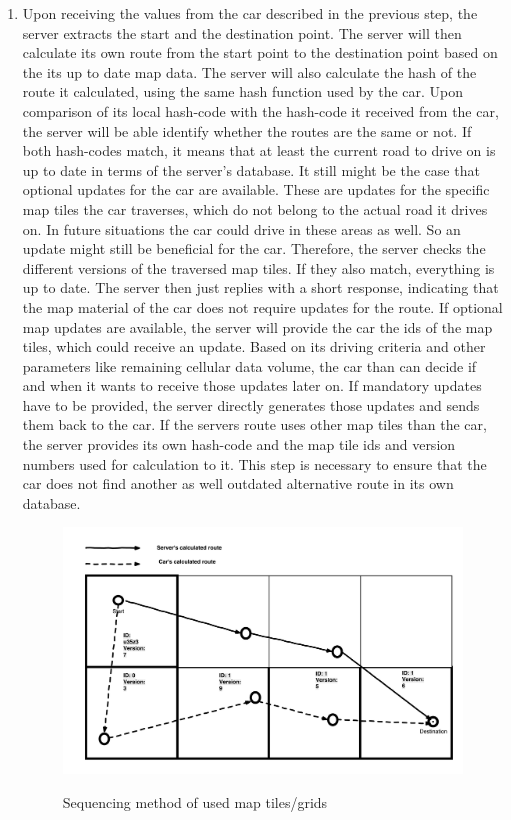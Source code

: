 \begin{enumerate}
\item Upon receiving the values from the car described in the previous step, the server extracts the start and the destination point. The server will then calculate its own route from the start point to the destination point based on the its up to date map data. The server will also calculate the hash of the route it calculated, using the same hash function used by the car. Upon comparison of its local hash-code with the hash-code it received from the car, the server will be able identify whether the routes are the same or not. If both hash-codes match, it means that at least the current road to drive on is up to date in terms of the server's database. It still might be the case that optional updates for the car are available. These are updates for the specific map tiles the car traverses, which do not belong to the actual road it drives on. In future situations the car could drive in these areas as well. So an update might still be beneficial for the car. Therefore, the server checks the different versions of the traversed map tiles. If they also match, everything is up to date. The server then just replies with a short response, indicating that the map material of the car does not require updates for the route. If optional map updates are available, the server will provide the car the ids of the map tiles, which could receive an update. Based on its driving criteria and other parameters like remaining cellular data volume, the car than can decide if and when it wants to receive those updates later on. If mandatory updates have to be provided, the server directly generates those updates and sends them back to the car. If the servers route uses other map tiles than the car, the server provides its own hash-code and the map tile ids and version numbers used for calculation to it. This step is necessary to ensure that the car does not find another as well outdated alternative route in its own database. 


\begin{figure}
\centering
\includegraphics[scale=.2]{gridnumbering.png}
\label{fg:numbering}
\caption{Sequencing method of used map tiles/grids}
\end{figure}





\end{enumerate}
